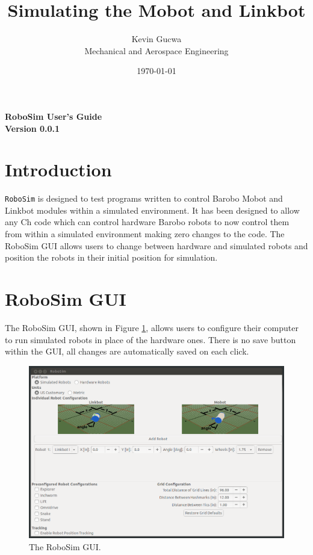 \documentclass{article}
\title{Simulating the Mobot and Linkbot}
\author{Kevin Gucwa\\Mechanical and Aerospace Engineering}
\date{\today}
\begin{document}
\begin{center}
{\Huge\sf\bf RoboSim User's Guide}\\
\vspace*{2.5cm}
{\Large\bf Version 0.0.1}
\vspace{4.5cm}
\end{center}

\newpage
\tableofcontents
\newpage

\section{Introduction}
\texttt{RoboSim} is designed to test programs written to control Barobo Mobot
and Linkbot modules within a simulated environment.  It has been designed to
allow any Ch code which can control hardware Barobo robots to now control them
from within a simulated environment making zero changes to the code.  The
RoboSim GUI allows users to change between hardware and simulated robots and
position the robots in their initial position for simulation.

\section{RoboSim GUI}
\label{sec:gui}
The RoboSim GUI, shown in Figure \ref{fig:gui}, allows users to configure their
computer to run simulated robots in place of the hardware ones.  There is no
save button within the GUI, all changes are automatically saved on each click.

\begin{figure}[H]
	\begin{center}
		\includegraphics[width=6in]{images/gui}
	\end{center}
	\caption{The RoboSim GUI.}
	\label{fig:gui}
\end{figure}
\end{document}
